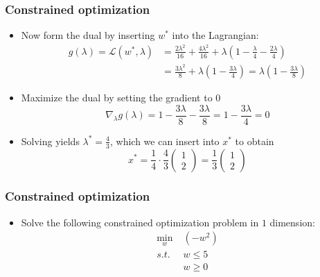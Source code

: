 \documentclass[10pt]{beamer}
\begin{document}
\begin{frame}
  \frametitle{Constrained optimization}
  \begin{itemize}
	\item Now form the dual by inserting $w^*$ into the Lagrangian:
	\begin{align*}
	g(\lambda) = \mathcal{L}(w^*,\lambda) &= \frac {2\lambda^2} {16} + \frac {4\lambda^2} {16} + \lambda ( 1 - \frac \lambda 4 - \frac {2\lambda} 4) \\
	  &= \frac {3\lambda^2} 8 + \lambda( 1 - \frac {3\lambda} 4 ) = \lambda( 1 - \frac {3\lambda} 8 )
	\end{align*}
	\pause
	\item Maximize the dual by setting the gradient to $0$
	\[\nabla_\lambda g(\lambda) = 1 - \frac {3\lambda} 8 - \frac {3\lambda} 8 = 1 - \frac {3\lambda} 4 = 0\]
	\pause
	\item Solving yields $\lambda^*=\frac 4 3$, which we can insert into $x^*$ to obtain
	\[x^* = \frac 1 4 \cdot \frac 4 3 \left( \begin{array}{c} 1 \\ 2 \end{array} \right) = \frac 1 3 \left( \begin{array}{c} 1 \\ 2 \end{array} \right) \]
  \end{itemize}
\end{frame}

\begin{frame}
  \frametitle{Constrained optimization}
  \begin{itemize}
	\item Solve the following constrained optimization problem in $1$ dimension:
	\begin{align*}
	\min_w \; & (-w^2)\\
	s.t. \; & w \leq 5\\
	 & w \geq 0
	\end{align*}
  \end{itemize}
\end{frame}
\end{document}
